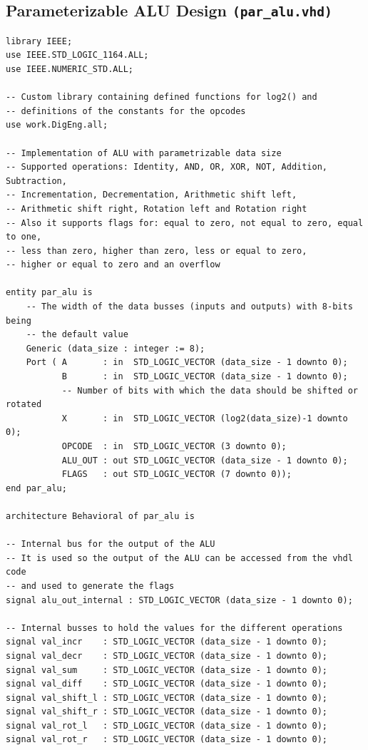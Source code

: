 \documentclass[10pt]{article}
\begin{document}
\subsection{Parameterizable ALU Design \texttt{(par\_alu.vhd)}}
\begin{verbatim}
library IEEE;
use IEEE.STD_LOGIC_1164.ALL;
use IEEE.NUMERIC_STD.ALL;

-- Custom library containing defined functions for log2() and
-- definitions of the constants for the opcodes
use work.DigEng.all;

-- Implementation of ALU with parametrizable data size
-- Supported operations: Identity, AND, OR, XOR, NOT, Addition, Subtraction, 
-- Incrementation, Decrementation, Arithmetic shift left, 
-- Arithmetic shift right, Rotation left and Rotation right
-- Also it supports flags for: equal to zero, not equal to zero, equal to one, 
-- less than zero, higher than zero, less or equal to zero, 
-- higher or equal to zero and an overflow

entity par_alu is
    -- The width of the data busses (inputs and outputs) with 8-bits being 
    -- the default value
    Generic (data_size : integer := 8);
    Port ( A       : in  STD_LOGIC_VECTOR (data_size - 1 downto 0);
           B       : in  STD_LOGIC_VECTOR (data_size - 1 downto 0);
           -- Number of bits with which the data should be shifted or rotated
           X       : in  STD_LOGIC_VECTOR (log2(data_size)-1 downto 0);
           OPCODE  : in  STD_LOGIC_VECTOR (3 downto 0);
           ALU_OUT : out STD_LOGIC_VECTOR (data_size - 1 downto 0);
           FLAGS   : out STD_LOGIC_VECTOR (7 downto 0));
end par_alu;

architecture Behavioral of par_alu is

-- Internal bus for the output of the ALU
-- It is used so the output of the ALU can be accessed from the vhdl code 
-- and used to generate the flags
signal alu_out_internal : STD_LOGIC_VECTOR (data_size - 1 downto 0);

-- Internal busses to hold the values for the different operations
signal val_incr    : STD_LOGIC_VECTOR (data_size - 1 downto 0);
signal val_decr    : STD_LOGIC_VECTOR (data_size - 1 downto 0);
signal val_sum     : STD_LOGIC_VECTOR (data_size - 1 downto 0);
signal val_diff    : STD_LOGIC_VECTOR (data_size - 1 downto 0);
signal val_shift_l : STD_LOGIC_VECTOR (data_size - 1 downto 0);
signal val_shift_r : STD_LOGIC_VECTOR (data_size - 1 downto 0);
signal val_rot_l   : STD_LOGIC_VECTOR (data_size - 1 downto 0);
signal val_rot_r   : STD_LOGIC_VECTOR (data_size - 1 downto 0);


\end{verbatim}
\end{document}
